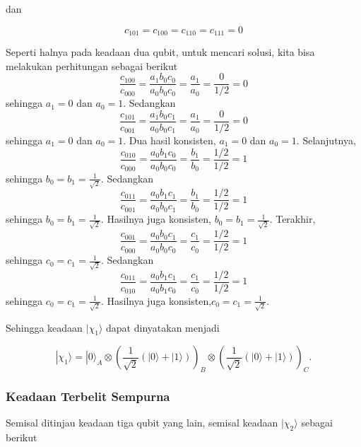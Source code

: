 dan

\begin{equation}
	c_{101}=c_{100}=c_{110}=c_{111}=0
\end{equation}

Seperti halnya pada keadaan dua qubit, untuk mencari solusi, kita bisa melakukan perhitungan sebagai berikut
\begin{equation}
\frac{c_{100}}{c_{000}}=\frac{a_1 b_0 c_0}{a_0 b_0 c_0}=\frac{a_1}{a_0}=\frac{0}{1/2}=0
\end{equation}
sehingga $a_1=0$ dan $a_0=1$.
Sedangkan
\begin{equation}
\frac{c_{101}}{c_{001}}=\frac{a_1 b_0 c_1}{a_0 b_0 c_1}=\frac{a_1}{a_0}=\frac{0}{1/2}=0
\end{equation}
sehingga $a_1=0$ dan $a_0=1$.
Dua hasil konsisten, $a_1=0$ dan $a_0=1$. Selanjutnya,
\begin{equation}
	\frac{c_{010}}{c_{000}}=\frac{a_0 b_1 c_0}{a_0 b_0 c_0}=\frac{b_1}{b_0}=\frac{1/2}{1/2}=1
\end{equation}
sehingga $b_0=b_1=\frac{1}{\sqrt{2}}$.
Sedangkan
\begin{equation}
	\frac{c_{011}}{c_{001}}=\frac{a_0 b_1 c_1}{a_0 b_0 c_1}=\frac{b_1}{b_0}=\frac{1/2}{1/2}=1
\end{equation}
sehingga $b_0=b_1=\frac{1}{\sqrt{2}}$.
Hasilnya juga konsisten, $b_0=b_1=\frac{1}{\sqrt{2}}$. Terakhir,
\begin{equation}
	\frac{c_{001}}{c_{000}}=\frac{a_0 b_0 c_1}{a_0 b_0 c_0}=\frac{c_1}{c_0}=\frac{1/2}{1/2}=1
\end{equation}
sehingga $c_0=c_1=\frac{1}{\sqrt{2}}$.
Sedangkan
\begin{equation}
	\frac{c_{011}}{c_{010}}=\frac{a_0 b_1 c_1}{a_0 b_1 c_0}=\frac{c_1}{c_0}=\frac{1/2}{1/2}=1
\end{equation}
sehingga $c_0=c_1=\frac{1}{\sqrt{2}}$.
Hasilnya juga konsisten,$c_0=c_1=\frac{1}{\sqrt{2}}$.

Sehingga keadaan $|\chi_1\rangle$ dapat dinyatakan menjadi

\begin{equation}
|\chi_1\rangle
=
|0\rangle_A \otimes
\left(
\frac{1}{\sqrt{2}}
(|0\rangle + |1\rangle)
\right)_B
\otimes
\left(
\frac{1}{\sqrt{2}}
(|0\rangle + |1\rangle)
\right)_C .
\end{equation}

\subsubsection{Keadaan Terbelit Sempurna}
\par
Semisal ditinjau keadaan tiga qubit yang lain, semisal keadaan $|\chi_2\rangle$ sebagai berikut

